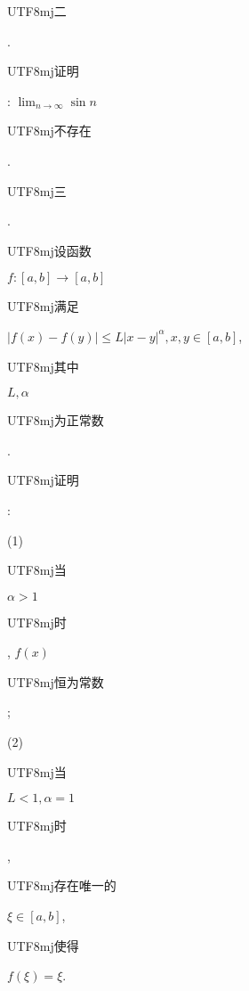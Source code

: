\documentclass[10pt]{article}
\begin{document}
\begin{CJK}{UTF8}{mj}二\end{CJK}. \begin{CJK}{UTF8}{mj}证明\end{CJK}: $\lim _{n \rightarrow \infty} \sin n$ \begin{CJK}{UTF8}{mj}不存在\end{CJK}.

\begin{CJK}{UTF8}{mj}三\end{CJK}. \begin{CJK}{UTF8}{mj}设函数\end{CJK} $f:[a, b] \rightarrow[a, b]$ \begin{CJK}{UTF8}{mj}满足\end{CJK} $|f(x)-f(y)| \leqslant L|x-y|^{\alpha}, x, y \in[a, b]$, \begin{CJK}{UTF8}{mj}其中\end{CJK} $L, \alpha$ \begin{CJK}{UTF8}{mj}为正常数\end{CJK}. \begin{CJK}{UTF8}{mj}证明\end{CJK}:

(1) \begin{CJK}{UTF8}{mj}当\end{CJK} $\alpha>1$ \begin{CJK}{UTF8}{mj}时\end{CJK}, $f(x)$ \begin{CJK}{UTF8}{mj}恒为常数\end{CJK};

(2) \begin{CJK}{UTF8}{mj}当\end{CJK} $L<1, \alpha=1$ \begin{CJK}{UTF8}{mj}时\end{CJK}, \begin{CJK}{UTF8}{mj}存在唯一的\end{CJK} $\xi \in[a, b]$, \begin{CJK}{UTF8}{mj}使得\end{CJK} $f(\xi)=\xi$.
\end{document}
